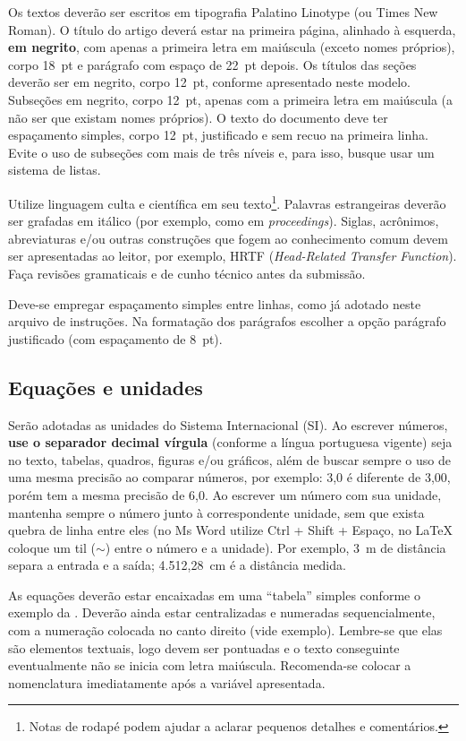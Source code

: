 \documentclass[12pt, a4paper, twoside, twocolumn]{article}
\begin{document}
Os textos deverão ser escritos em tipografia Palatino Linotype (ou Times New Roman). O título do artigo deverá estar na primeira página, alinhado à esquerda, \textbf{em negrito}, com apenas a primeira letra em maiúscula (exceto nomes próprios), corpo 18~pt e parágrafo com espaço de 22~pt depois. Os títulos das seções deverão ser em negrito, corpo 12~pt, conforme apresentado neste modelo. Subseções em negrito, corpo 12~pt, apenas com a primeira letra em maiúscula (a não ser que existam nomes próprios). O texto do documento deve ter espaçamento simples, corpo 12~pt, justificado e sem recuo na primeira linha. Evite o uso de subseções com mais de três níveis e, para isso, busque usar um sistema de listas. 

Utilize linguagem culta e científica em seu texto\footnote{Notas de rodapé podem ajudar a aclarar pequenos detalhes e comentários.}. Palavras estrangeiras deverão ser grafadas em itálico (por exemplo, como em \textit{proceedings}). Siglas, acrônimos, abreviaturas e/ou outras construções que fogem ao conhecimento comum devem ser apresentadas ao leitor, por exemplo, HRTF (\textit{Head-Related Transfer Function}).
Faça revisões gramaticais e de cunho técnico antes da submissão.

Deve-se empregar espaçamento simples entre linhas, como já adotado neste arquivo de instruções.
Na formatação dos parágrafos escolher a opção parágrafo justificado (com espaçamento de 8~pt).

\subsection{Equações e unidades}

Serão adotadas as unidades do Sistema Internacional (SI). Ao escrever números, \textbf{use o separador decimal vírgula} (conforme a língua portuguesa vigente) seja no texto, tabelas, quadros, figuras e/ou gráficos, além de buscar sempre o uso de uma mesma precisão ao comparar números, por exemplo: 3,0 é diferente de 3,00, porém tem a mesma precisão de 6,0. Ao escrever um número com sua unidade, mantenha sempre o número junto à correspondente unidade, sem que exista quebra de linha entre eles (no Ms Word utilize Ctrl + Shift + Espaço, no \LaTeX\xspace coloque um til ($\sim$) entre o número e a unidade). Por exemplo, 3~m de distância separa a entrada e a saída; 4.512,28~cm é a distância medida.

As equações deverão estar encaixadas em uma ``tabela'' simples conforme o exemplo da . Deverão ainda estar centralizadas e numeradas sequencialmente, com a numeração colocada no canto direito (vide exemplo). Lembre-se que elas são elementos textuais, logo devem ser pontuadas e o texto conseguinte eventualmente não se inicia com letra maiúscula. Recomenda-se colocar a nomenclatura imediatamente após a variável apresentada.
\end{document}
